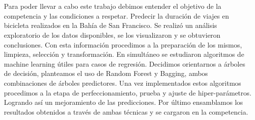 \section*{}
Para poder llevar a cabo este trabajo debimos entender el objetivo de la competencia y las condiciones a respetar. Predecir la duración de viajes en bicicleta realizados en la Bahía de San Francisco.
Se realizó un análisis exploratorio de los datos disponibles, se los visualizaron y se obtuvieron conclusiones. Con esta información procedimos a la preparación de los mismos, limpieza, selección y transformación.
En simultáneo se estudiaron algoritmos de machine learning útiles para casos de regresión. Decidimos orientarnos a árboles de decisión, planteamos el uso de Random Forest y Bagging, ambos combinaciones de árboles predictores. 
Una vez implementados estos algoritmos procedimos a la etapa de perfeccionamiento, prueba y ajuste de hiper-parámetros. Logrando así un mejoramiento de las predicciones.
Por último ensamblamos los resultados obtenidos a través de ambas técnicas y se cargaron en la competencia.